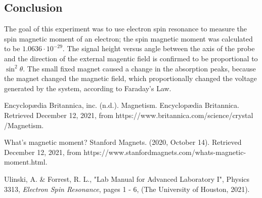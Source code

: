 \documentclass[twoside,10pt]{article}
\begin{document}
\begin{multicols}{2}
		\section{Conclusion}
		The goal of this experiment was to use electron spin resonance to measure the spin magnetic moment of an electron; the spin magnetic moment was calculated to be $1.0636 \cdot 10^{-29}$. The signal height versus angle between the axis of the probe and the direction of the external magentic field is confirmed to be proportional to $\sin^2\theta$. The small fixed magnet caused a change in the absorption peaks, because the magnet changed the magnetic field, which proportionally changed the voltage generated by the system, according to Faraday's Law. 
		
		
		
		\begin{thebibliography}{99} %
			\raggedright
			
			\begin{small}
			Encyclopædia Britannica, inc. (n.d.). Magnetism. Encyclopædia Britannica. Retrieved December 12, 2021, from https://www.britannica.com/science/crystal
			/Magnetism. 

				
				What's magnetic moment? Stanford Magnets. (2020, October 14). Retrieved December 12, 2021, from https://www.stanfordmagnets.com/whats-magnetic-moment.html. 

			Ulinski, A. \& Forrest, R. L., "Lab Manual for Advanced Laboratory I", Physics 3313, \textit{Electron Spin Resonance}, pages 1 - 6, (The University of Houston, 2021).
			\end{small}
			
			
		\end{thebibliography}
		
		
	\end{multicols}
	
\end{document}
